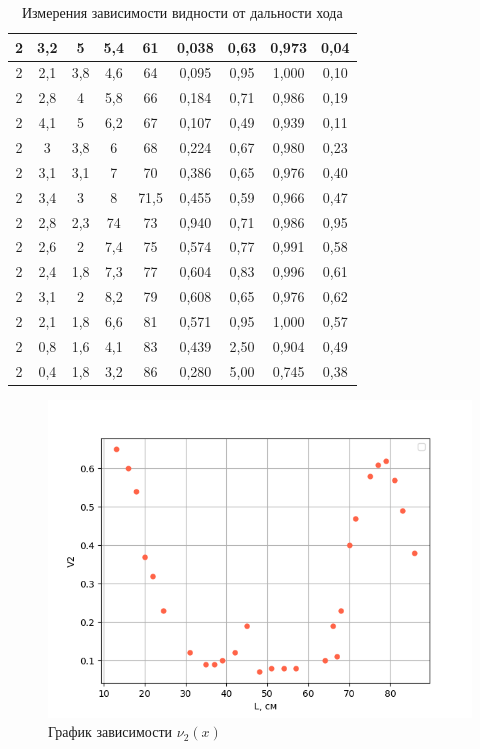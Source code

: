 \documentclass[a4paper,12pt]{article}
\begin{document}
\begin{table}[h!]
\begin{tabular}{|c|c|c|c|c|c|c|c|c|}
2     & 3,2   & 5     & 5,4   & 61   & 0,038 & 0,63     & 0,973 & 0,04  \\ \hline
2     & 2,1   & 3,8   & 4,6   & 64   & 0,095 & 0,95     & 1,000 & 0,10  \\ \hline
2     & 2,8   & 4     & 5,8   & 66   & 0,184 & 0,71     & 0,986 & 0,19  \\ \hline
2     & 4,1   & 5     & 6,2   & 67   & 0,107 & 0,49     & 0,939 & 0,11  \\ \hline
2     & 3     & 3,8   & 6     & 68   & 0,224 & 0,67     & 0,980 & 0,23  \\ \hline
2     & 3,1   & 3,1   & 7     & 70   & 0,386 & 0,65     & 0,976 & 0,40  \\ \hline
2     & 3,4   & 3     & 8     & 71,5 & 0,455 & 0,59     & 0,966 & 0,47  \\ \hline
2     & 2,8   & 2,3   & 74    & 73   & 0,940 & 0,71     & 0,986 & 0,95  \\ \hline
2     & 2,6   & 2     & 7,4   & 75   & 0,574 & 0,77     & 0,991 & 0,58  \\ \hline
2     & 2,4   & 1,8   & 7,3   & 77   & 0,604 & 0,83     & 0,996 & 0,61  \\ \hline
2     & 3,1   & 2     & 8,2   & 79   & 0,608 & 0,65     & 0,976 & 0,62  \\ \hline
2     & 2,1   & 1,8   & 6,6   & 81   & 0,571 & 0,95     & 1,000 & 0,57  \\ \hline
2     & 0,8   & 1,6   & 4,1   & 83   & 0,439 & 2,50     & 0,904 & 0,49  \\ \hline
2     & 0,4   & 1,8   & 3,2   & 86   & 0,280 & 5,00     & 0,745 & 0,38  \\ \hline
\end{tabular}
        \caption{Измерения зависимости видности от дальности хода}
    \label{table_v2}
\end{table}

\begin{figure}[h!]
	\begin{center}
		\includegraphics[scale = 0.8]{452_2.png}
	\end{center}
	\caption{График зависимости $ \nu_2(x)$}
\end{figure}
\end{document}
